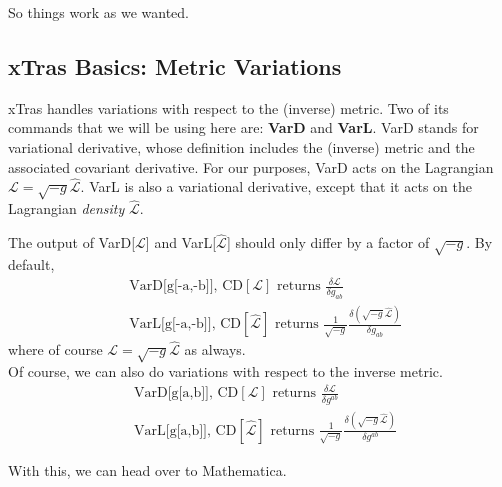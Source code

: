 \documentclass{book}
\theoremstyle{definition}
\newcommand{\lag}{\mathcal{L}}
\newcommand{\f}[2]{\frac{#1}{#2}}
\begin{document}
So things work as we wanted.










\newpage



\subsection{xTras Basics: Metric Variations}

xTras handles variations with respect to the (inverse) metric. Two of its commands that we will be using here are: \textbf{VarD} and \textbf{VarL}. VarD stands for variational derivative, whose definition includes the (inverse) metric and the associated covariant derivative. For our purposes, VarD acts on the Lagrangian $\lag = \sqrt{-g}\hat{\lag}$. VarL is also a variational derivative, except that it acts on the Lagrangian \textit{density} $\hat{\lag}$. 

















   
The output of VarD[$\lag$] and VarL[$\hat{\lag}$] should only differ by a factor of $\sqrt{-g}$. By default,
\begin{align}
&\text{VarD[g[-a,-b]], CD}[\lag] \text{ returns } \f{\delta \lag}{\delta g_{ab}} \\ 
&\text{VarL[g[-a,-b]], CD}[\hat{\lag}] \text{ returns } \f{1}{\sqrt{-g}}\f{\delta (\sqrt{-g}\hat{\lag})}{\delta g_{ab}}
\end{align} 
where of course $\lag = \sqrt{-g}\hat{\lag}$ as always. \\

Of course, we can also do variations with respect to the inverse metric. 
\begin{align}
&\text{VarD[g[a,b]], CD}[\lag] \text{ returns } \f{\delta \lag}{\delta g^{ab}} \\ 
&\text{VarL[g[a,b]], CD}[\hat{\lag}] \text{ returns } \f{1}{\sqrt{-g}}\f{\delta (\sqrt{-g}\hat{\lag})}{\delta g^{ab}}
\end{align} 


With this, we can head over to Mathematica. \\
\end{document}
